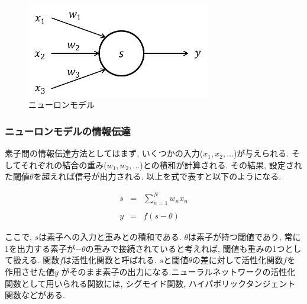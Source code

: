 \begin{figure}[htbp]
  \begin{center}
    \includegraphics[clip,width=8.0cm]{./images/NeuronModel.png}
    \caption{ニューロンモデル}
    \label{fig:neuron_model}
  \end{center}
\end{figure}

\subsubsection{ニューロンモデルの情報伝達}
素子間の情報伝達方法としてはまず, いくつかの入力($x_1, x_2, \ldots $)が与えられる. そしてそれぞれの結合の重み($w_1, w_2, \ldots $)との積和が計算される. その結果, 設定された閾値$θ$を超えれば信号が出力される. 以上を式で表すと以下のようになる.

\begin{eqnarray}
  \displaystyle s &=& \sum_{n=1}^{N}w_nx_n
  \label{eq:neuron_model_1}\\
  \nonumber\\
  y &=& f(s-θ)
  \label{eq:neuron_model_2}
\end{eqnarray}

\noindent
ここで, $s$は素子への入力と重みとの積和である. $θ$は素子が持つ閾値であり, 常に1を出力する素子が$-θ$の重みで接続されていると考えれば, 閾値も重みの1つとして扱える. 関数$f$は活性化関数と呼ばれる. $s$と閾値$θ$の差に対して活性化関数$f$を作用させた値$y$ がそのまま素子の出力になる.ニューラルネットワークの活性化関数として用いられる関数には, シグモイド関数, ハイパボリックタンジェント関数などがある.\\

